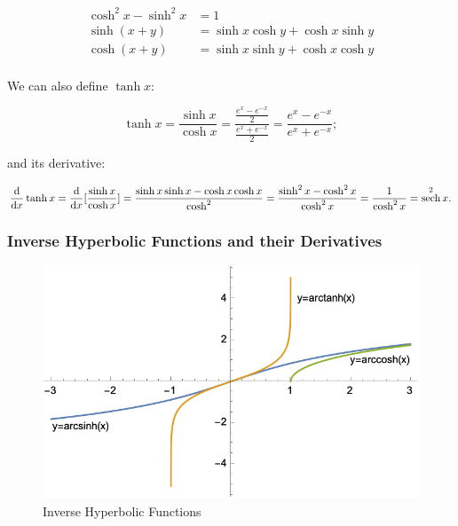 \documentclass[12pt]{article}
\DeclareMathOperator{\sech}{sech}
\begin{document}
\begin{equation}
    \begin{split}
        \cosh^2 x - \sinh^2 x &= 1\\
        \sinh(x+y) &= \sinh x \cosh y + \cosh x \sinh y\\
        \cosh(x+y) &= \sinh x \sinh y + \cosh x \cosh y\\
    \end{split}
\end{equation}

We can also define $\tanh x$:

$$\tanh x = \frac{\sinh x}{\cosh x} = \frac{\frac{e^x-e^{-x}}{2}}{\frac{e^x+e^{-x}}{2}}=\frac{e^x-e^{-x}}{e^x+e^{-x}};$$

and its derivative:


$$\ddx \tanh x = \ddx [\frac{\sinh x}{\cosh x}] = \frac{\sinh x \sinh x - \cosh x \cosh x}{\cosh^2} = \frac{\sinh^2 x - \cosh^2 x}{\cosh^2 x} = \frac{1}{\cosh^2 x} = \sech^2 x.$$

\subsubsection{Inverse Hyperbolic Functions and their Derivatives}

\begin{figure}[!ht]
    \centering
    \includegraphics{misc/inversehyperbolic.png}
    \caption{Inverse Hyperbolic Functions}
    \label{inversehyperbolic}
\end{figure}
\end{document}
